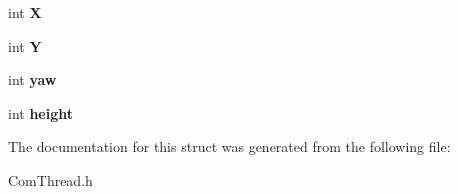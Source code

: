 \begin{DoxyCompactItemize}
\item 
\hypertarget{struct_w_a_y_p_o_i_n_t_acbdc166f2fbc343226424d8c1c762b43}{int {\bfseries X}}\label{struct_w_a_y_p_o_i_n_t_acbdc166f2fbc343226424d8c1c762b43}

\item 
\hypertarget{struct_w_a_y_p_o_i_n_t_a2ede5389159817dba1218abfa68cbc9d}{int {\bfseries Y}}\label{struct_w_a_y_p_o_i_n_t_a2ede5389159817dba1218abfa68cbc9d}

\item 
\hypertarget{struct_w_a_y_p_o_i_n_t_ad31591e8543f40289d4cea156095b039}{int {\bfseries yaw}}\label{struct_w_a_y_p_o_i_n_t_ad31591e8543f40289d4cea156095b039}

\item 
\hypertarget{struct_w_a_y_p_o_i_n_t_a909cd0c7e2bd08667b406048e70d10a0}{int {\bfseries height}}\label{struct_w_a_y_p_o_i_n_t_a909cd0c7e2bd08667b406048e70d10a0}

\end{DoxyCompactItemize}


The documentation for this struct was generated from the following file\-:\begin{DoxyCompactItemize}
\item 
Com\-Thread.\-h\end{DoxyCompactItemize}
